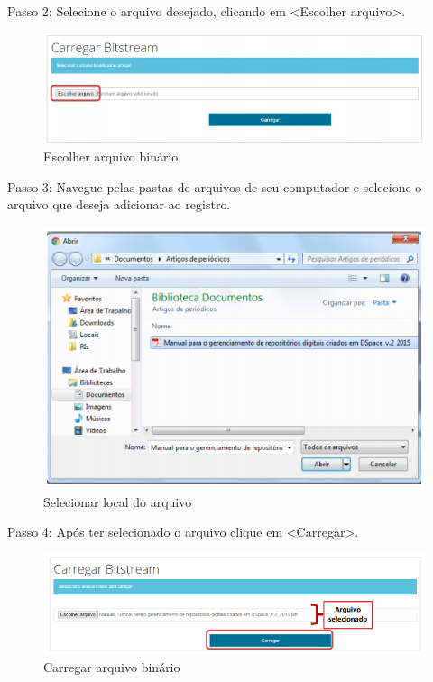 \documentclass[12pt,hidelinks]{article}
\begin{document}
\newpage
    
    Passo 2: Selecione o arquivo desejado, clicando em <Escolher arquivo>.
    
    \begin{figure}[!htp]
                \centering
                \includegraphics[scale=0.7]{figura/Figura96.png}
                \caption{Escolher arquivo binário}
            \label{Rotulo}
        \end{figure}
    
    Passo 3: Navegue pelas pastas de arquivos de seu computador e selecione o arquivo que deseja adicionar ao registro.
    
    \begin{figure}[!htp]
                \centering
                \includegraphics[scale=0.7]{figura/Figura97.png}
                \caption{Selecionar local do arquivo}
            \label{Rotulo}
        \end{figure}
    
    Passo 4: Após ter selecionado o arquivo clique em <Carregar>.
    
    \begin{figure}[!htp]
                \centering
                \includegraphics[scale=0.7]{figura/Figura98.png}
                \caption{Carregar arquivo binário}
            \label{Rotulo}
        \end{figure}
\end{document}
